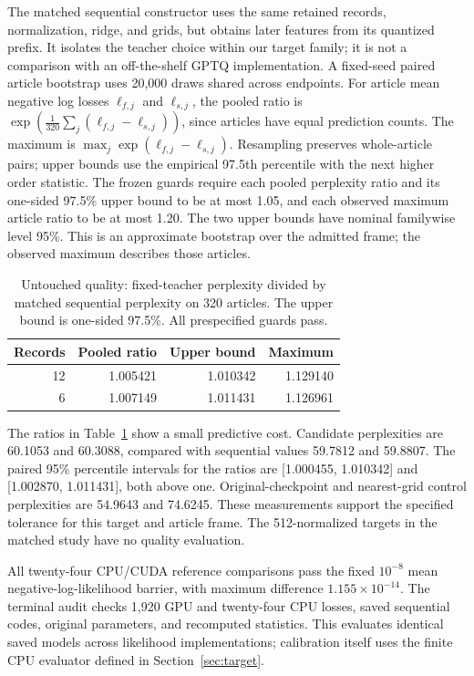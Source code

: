 \documentclass[11pt,a4paper]{article}
\begin{document}
The matched sequential constructor uses the same retained records, normalization,
ridge, and grids, but obtains later features from its quantized prefix. It
isolates the teacher choice within our target family; it is not a comparison
with an off-the-shelf GPTQ implementation. A fixed-seed paired article bootstrap
uses 20,000 draws shared across endpoints. For article mean negative log losses
$\ell_{f,j}$ and $\ell_{s,j}$, the pooled ratio is
$\exp(\frac{1}{320}\sum_j(\ell_{f,j}-\ell_{s,j}))$, since articles have equal
prediction counts. The maximum is $\max_j\exp(\ell_{f,j}-\ell_{s,j})$.
Resampling preserves whole-article pairs; upper bounds use the empirical
97.5th percentile with the next higher order statistic.
The frozen guards require each pooled perplexity ratio and its
one-sided 97.5\% upper bound to be at most 1.05, and each observed maximum article
ratio to be at most 1.20. The two upper bounds have nominal familywise level
95\%. This is an approximate bootstrap over the admitted frame; the observed
maximum describes those articles.

\begin{table}[t]
\centering\small
\begin{tabular}{@{}rrrr@{}}
\toprule
Records & Pooled ratio & Upper bound & Maximum \\
\midrule
12 & 1.005421 & 1.010342 & 1.129140 \\
6 & 1.007149 & 1.011431 & 1.126961 \\
\bottomrule
\end{tabular}
\caption{Untouched quality: fixed-teacher perplexity divided by matched
sequential perplexity on 320 articles. The upper bound is one-sided 97.5\%.
All prespecified guards pass.}
\label{tab:quality}
\end{table}

The ratios in Table~\ref{tab:quality} show a small predictive cost. Candidate
perplexities are 60.1053 and 60.3088, compared with sequential values 59.7812 and
59.8807. The paired 95\% percentile intervals for the ratios are
[1.000455, 1.010342] and [1.002870, 1.011431], both above one. Original-checkpoint
and nearest-grid control perplexities are 54.9643 and 74.6245. These measurements
support the specified tolerance for this target and article frame. The
512-normalized targets in the matched study have no quality evaluation.

All twenty-four CPU/CUDA reference comparisons pass the fixed $10^{-8}$ mean
negative-log-likelihood barrier, with maximum difference $1.155\times10^{-14}$.
The terminal audit checks 1,920 GPU and twenty-four CPU losses, saved sequential
codes, original parameters, and recomputed statistics. This evaluates identical
saved models across likelihood implementations; calibration itself uses the
finite CPU evaluator defined in Section~\ref{sec:target}.
\end{document}
